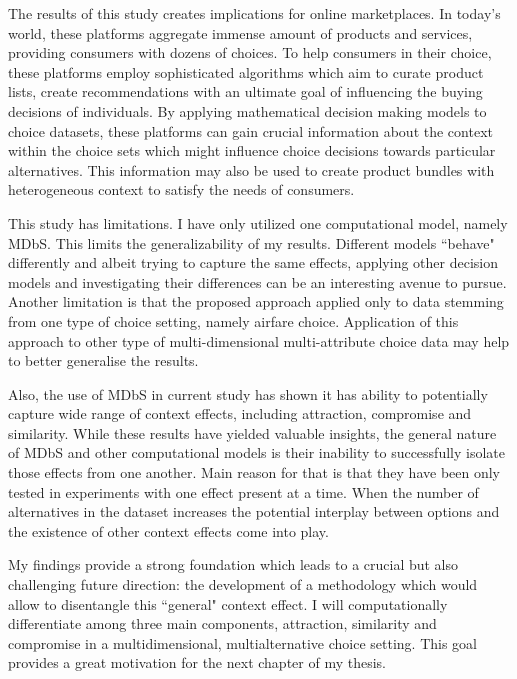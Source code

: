 \documentclass[a4paper,12pt]{article}
\begin{document}
The results of this study creates implications for online marketplaces. In today's world, these platforms aggregate immense amount of products and services, providing consumers with dozens of choices. To help consumers in their choice, these platforms employ sophisticated algorithms which aim to curate product lists, create recommendations with an ultimate goal of influencing the buying decisions of individuals. By applying mathematical decision making models to choice datasets, these platforms can gain crucial information about the context within the choice sets which might influence choice decisions towards particular alternatives. This information may also be used to create product bundles with heterogeneous context to satisfy the needs of consumers.

This study has limitations. I have only utilized one computational model, namely MDbS. This limits the generalizability of my results. Different models ``behave" differently and albeit trying to capture the same effects, applying other decision models and investigating their differences can be an interesting avenue to pursue. Another limitation is that the proposed approach applied only to data stemming from one type of choice setting, namely airfare choice. Application of this approach to other type of multi-dimensional multi-attribute choice data may help to better generalise the results.

Also, the use of MDbS in current study has shown it has ability to potentially capture wide range of context effects, including attraction, compromise and similarity. While these results have yielded valuable insights, the general nature of MDbS and other computational models is their inability to successfully isolate those effects from one another. Main reason for that is that they have been only tested in experiments with one effect present at a time. When the number of alternatives in the dataset increases the potential interplay between options and the existence of other context effects come into play. 

My findings provide a strong foundation which leads to a crucial but also challenging future direction: the development of a methodology which would allow to disentangle this ``general" context effect. I will computationally differentiate among three main components, attraction, similarity and compromise in a multidimensional, multialternative choice setting. This goal provides a great motivation for the next chapter of my thesis.

\newpage
\end{document}
